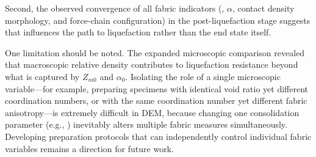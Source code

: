 Second, the observed convergence of all fabric indicators (\Zm{}, $\alpha$, contact density morphology, and force-chain configuration) in the post-liquefaction stage suggests that \Kzero{} influences the path to liquefaction rather than the end state itself.

One limitation should be noted. The expanded microscopic comparison revealed that macroscopic relative density contributes to liquefaction resistance beyond what is captured by $Z_{m0}$ and $\alpha_0$. Isolating the role of a single microscopic variable---for example, preparing specimens with identical void ratio yet different coordination numbers, or with the same coordination number yet different fabric anisotropy---is extremely difficult in DEM, because changing one consolidation parameter (e.g., \Kzero{}) inevitably alters multiple fabric measures simultaneously. Developing preparation protocols that can independently control individual fabric variables remains a direction for future work.
